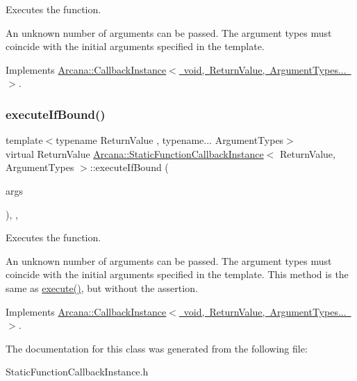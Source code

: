 Executes the function. 

An unknown number of arguments can be passed. The argument types must coincide with the initial arguments specified in the template. 

Implements \mbox{\hyperlink{class_arcana_1_1_callback_instance_aa5bd9b4ee2129a0c22a98f7fa1cfc724}{Arcana\+::\+Callback\+Instance$<$ void, Return\+Value, Argument\+Types... $>$}}.

\mbox{\label{class_arcana_1_1_static_function_callback_instance_a1e498222014df725ab8dfb737b48c2ef}} 
\subsubsection{\texorpdfstring{execute\+If\+Bound()}{executeIfBound()}}
{\footnotesize\ttfamily template$<$typename Return\+Value , typename... Argument\+Types$>$ \\
virtual Return\+Value \mbox{\hyperlink{class_arcana_1_1_static_function_callback_instance}{Arcana\+::\+Static\+Function\+Callback\+Instance}}$<$ Return\+Value, Argument\+Types $>$\+::execute\+If\+Bound (\begin{DoxyParamCaption}\item[{Argument\+Types \&\&...}]{args }\end{DoxyParamCaption})\hspace{0.3cm}{\ttfamily [inline]}, {\ttfamily [override]}, {\ttfamily [virtual]}}



Executes the function. 

An unknown number of arguments can be passed. The argument types must coincide with the initial arguments specified in the template. This method is the same as \mbox{\hyperlink{class_arcana_1_1_static_function_callback_instance_a9666f5e80b24e6e38e5d3766a6a577ac}{execute()}}, but without the assertion. 

Implements \mbox{\hyperlink{class_arcana_1_1_callback_instance_af4aced5d787cabb857931ecd87c3ab50}{Arcana\+::\+Callback\+Instance$<$ void, Return\+Value, Argument\+Types... $>$}}.



The documentation for this class was generated from the following file\+:\begin{DoxyCompactItemize}
\item 
Static\+Function\+Callback\+Instance.\+h\end{DoxyCompactItemize}
